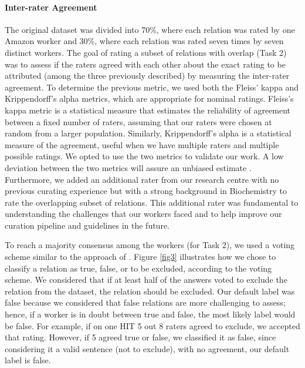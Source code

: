 \paragraph{Inter-rater Agreement}

The original dataset was divided into 70\%, where each relation was rated by one Amazon worker and 30\%, where each relation was rated seven times by seven distinct workers. The goal of rating a subset of relations with overlap (Task 2) was to assess if the raters agreed with each other about the exact rating to be attributed (among the three previously described) by measuring the inter-rater agreement. To determine the previous metric, we used both the Fleiss’ kappa \citep{mchugh2012interrater} and Krippendorff’s alpha \citep{krippendorff2011computing} metrics, which are appropriate for nominal ratings. Fleiss’s kappa metric is a statistical measure that estimates the reliability of agreement between a fixed number of raters, assuming that our raters were chosen at random from a larger population. Similarly, Krippendorff’s alpha is a statistical measure of the agreement, useful when we have multiple raters and multiple possible ratings. We opted to use the two metrics to validate our work. A low deviation between the two metrics will assure an unbiased estimate \citep{zapf2016measuring}. Furthermore, we added an additional rater from our research centre with no previous curating experience but with a strong background in Biochemistry to rate the overlapping subset of relations. This additional rater was fundamental to understanding the challenges that our workers faced and to help improve our curation pipeline and guidelines in the future.

To reach a majority consensus among the workers (for Task 2), we used a voting scheme similar to the approach of \cite{li2016crowdsourcing}. Figure \ref{fig3} illustrates how we chose to classify a relation as true, false, or to be excluded, according to the voting scheme. We considered that if at least half of the answers voted to exclude the relation from the dataset, the relation should be excluded. Our default label was false because we considered that false relations are more challenging to assess; hence, if a worker is in doubt between true and false, the most likely label would be false. For example, if on one HIT 5 out 8 raters agreed to exclude, we accepted that rating. However, if 5 agreed true or false, we classified it as false, since considering it a valid sentence (not to exclude), with no agreement, our default label is false.

